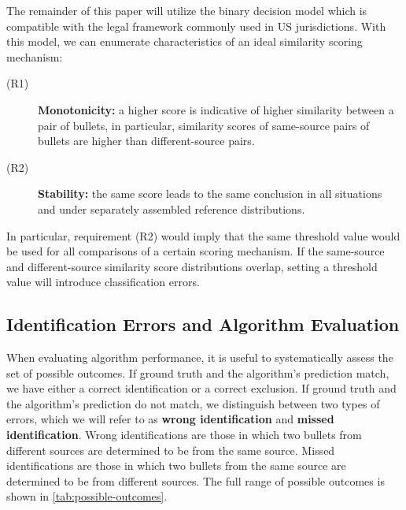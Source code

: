 \documentclass[doubleblind]{elsarticle}\usepackage[]{graphicx}\usepackage[]{color}
\begin{document}
The remainder of this paper will utilize the binary decision model which is compatible with the legal framework commonly used in US jurisdictions. With this model, we can enumerate characteristics of an ideal similarity scoring mechanism: 

\begin{description}
\item[(R1)] {\bf Monotonicity:} a higher score is indicative of higher similarity between a pair of bullets, in particular, similarity scores of same-source pairs of bullets are higher than different-source pairs.
\item[(R2)] {\bf Stability:} the same score leads to the same conclusion in all situations and under separately assembled reference distributions. 
\end{description}

In particular, requirement (R2) would imply that the same threshold value would be used for all comparisons of a certain scoring mechanism. If the same-source and different-source similarity score distributions overlap, setting a threshold value will introduce classification errors.


\subsection{Identification Errors and Algorithm Evaluation}

When evaluating algorithm performance, it is useful to systematically assess  the set of possible outcomes. If ground truth and the algorithm's prediction match, we have either a correct identification or a correct exclusion. If ground truth and the algorithm's prediction do not match, we distinguish between two types of errors, which we will refer to as \textbf{wrong identification} and \textbf{missed identification}. Wrong identifications are those in which two bullets from different sources are determined to be from the same source. Missed identifications are those in which two bullets from the same source are determined to be from different sources. The full range of possible outcomes is shown in \autoref{tab:possible-outcomes}.
\end{document}
